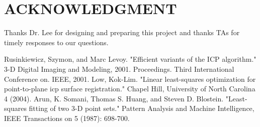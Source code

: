 \documentclass[letterpaper, 10 pt, conference]{ieeeconf}  %
\begin{document}
\addtolength{\textheight}{-12cm}   %







\section*{ACKNOWLEDGMENT}

Thanks Dr. Lee for designing and preparing this project and thanks TAs for timely responses to our questions.





\begin{thebibliography}{99}

 Rusinkiewicz, Szymon, and Marc Levoy. "Efficient variants of the ICP algorithm." 3-D Digital Imaging and Modeling, 2001. Proceedings. Third International Conference on. IEEE, 2001.
 Low, Kok-Lim. "Linear least-squares optimization for point-to-plane icp surface registration." Chapel Hill, University of North Carolina 4 (2004).
 Arun, K. Somani, Thomas S. Huang, and Steven D. Blostein. "Least-squares fitting of two 3-D point sets." Pattern Analysis and Machine Intelligence, IEEE Transactions on 5 (1987): 698-700.





\end{thebibliography}
\end{document}
